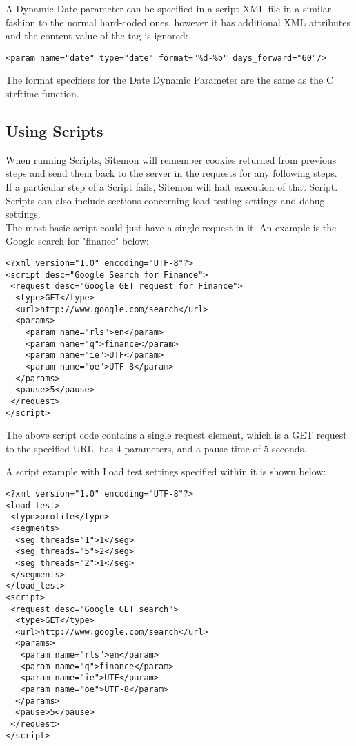 \documentclass[a4paper]{article}
\begin{document}
A Dynamic Date parameter can be specified in a script XML file in a similar fashion to the normal hard-coded ones, however it has additional XML attributes and the content value of the tag is ignored:
\begin{verbatim}
<param name="date" type="date" format="%d-%b" days_forward="60"/>
\end{verbatim}

The format specifiers for the Date Dynamic Parameter are the same as the C strftime function.

\subsection{Using Scripts}

When running Scripts, Sitemon will remember cookies returned from previous steps and send them
 back to the server in the requests for any following steps.\\
 
 If a particular step of a Script fails, Sitemon will halt execution of that Script.\\

Scripts can also include sections concerning load testing settings and debug settings.\\

The most basic script could just have a single request in it. An example is the Google search for "finance" below:

\begin{verbatim}
<?xml version="1.0" encoding="UTF-8"?>
<script desc="Google Search for Finance">
 <request desc="Google GET request for Finance">
  <type>GET</type>
  <url>http://www.google.com/search</url>
  <params>
    <param name="rls">en</param>
    <param name="q">finance</param>
    <param name="ie">UTF</param>
    <param name="oe">UTF-8</param>
  </params>
  <pause>5</pause>
 </request>    
</script>
\end{verbatim}

The above script code contains a single request element, which is a GET request to the specified URL, has 4 parameters, and a
 pause time of 5 seconds.

\pagebreak

A script example with Load test settings specified within it is shown below:

\begin{verbatim}
<?xml version="1.0" encoding="UTF-8"?>
<load_test>
 <type>profile</type>
 <segments>
  <seg threads="1">1</seg>
  <seg threads="5">2</seg>
  <seg threads="2">1</seg>
 </segments>
</load_test>
<script>
 <request desc="Google GET search">
  <type>GET</type>
  <url>http://www.google.com/search</url>
  <params>
   <param name="rls">en</param>
   <param name="q">finance</param>
   <param name="ie">UTF</param>
   <param name="oe">UTF-8</param>
  </params>
  <pause>5</pause>
 </request>
</script>
\end{verbatim}
\end{document}
